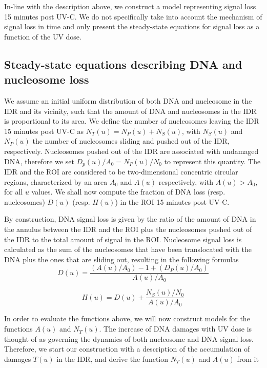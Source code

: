 \documentclass[12pt]{article}
\begin{document}
    In-line with the description above, we construct a model representing
	signal loss 15 minutes post UV-C. We do not specifically take into account the
	mechanism of signal loss in time and only present the steady-state equations
	for signal loss as a function of the UV dose.
	
	\subsection{Steady-state equations describing DNA and nucleosome loss}
	
	We assume an initial uniform distribution of both DNA and nucleosome in
	the IDR and its vicinity, such that the amount of DNA and nucleosomes in
	the IDR is proportional to its area. We define the number of nucleosomes leaving the IDR 15 minutes post UV-C as $N_T(u) = N_P(u) + N_S(u)$,
	with $N_S(u)$ and $N_P(u)$ the number of nucleosomes sliding and pushed out
	of the IDR, respectively. Nucleosomes pushed out of the IDR are associated
	with undamaged DNA, therefore we set $D_p(u)/A_0 = N_P(u)/N_0$ to represent this
	quantity. The IDR and the ROI are considered to be two-dimensional concentric circular regions, characterized by an area $A_0$ and $A(u)$ respectively,
	with $A(u) > A_0$, for all $u$ values. We shall now compute the fraction of
	DNA loss (resp. nucleosomes) $D(u)$ (resp. $H(u)$) in the ROI 15 minutes
	post UV-C.
	
	By construction, DNA signal loss is given by the ratio of the amount of
	DNA in the annulus between the IDR and the ROI plus the nucleosomes
	pushed out of the IDR to the total amount of signal in the ROI. Nucleosome signal loss is calculated as the sum of the nucleosomes that have been
	translocated with the DNA plus the ones that are sliding out, resulting in
	the following formulas
	\begin{equation}\label{eq:DNAstst}
	D(u) = \frac{(A(u)/A_0)-1 + (D_P(u)/A_0)}{A(u)/A_0}	
	\end{equation}
	
	\begin{equation}\label{eq:nucleosomeStst}
	H(u) = D(u) + \frac{N_S(u)/N_0}{A(u)/A_0}	
	\end{equation}
	
	In order to evaluate the functions above, we will now construct models
	for the functions $A(u)$ and $N_T(u)$. The increase of DNA damages with UV
	dose is thought of as governing the dynamics of both nucleosome and DNA
	signal loss. Therefore, we start our construction with a description of the
	accumulation of damages $T(u)$ in the IDR, and derive the function $N_T(u)$
	and $A(u)$ from it
	
\end{document}
